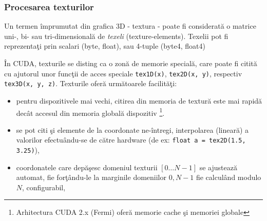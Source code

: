 \documentclass{article}
\begin{document}
\subsubsection{Procesarea texturilor}

\begin{minipage}{\textwidth}
Un termen împrumutat din grafica 3D - textura - poate fi considerată o matrice uni-, bi- sau tri-dimensională de \textit{texeli} (texture-elements). Texelii pot fi reprezentaţi prin scalari (byte, float), sau 4-tuple (byte4, float4)

În CUDA, texturile se disting ca o zonă de memorie specială, care poate fi citită cu ajutorul unor funcţii de acces speciale \texttt{tex1D(x)}, \texttt{tex2D(x, y)}, respectiv \texttt{tex3D(x, y, z)}. Texturile oferă următoarele facilităţi:

\begin{itemize}
	\item pentru dispozitivele mai vechi, citirea din memoria de textură este mai rapidă decât accesul din memoria globală dispozitiv \footnote{Arhitectura CUDA 2.x (Fermi) oferă memorie cache şi memoriei globale}.

	\item se pot citi şi elemente de la coordonate ne-întregi, interpolarea (lineară) a valorilor efectuându-se de către hardware (de ex: \texttt{float a = tex2D(1.5, 3.25)}),

	\item coordonatele care depăşesc domeniul texturii $[0 \dots N-1]$ se ajustează automat, fie forţându-le la marginile domeniilor $0, N-1$ fie calculând modulo $N$, configurabil,
\end{itemize}

\end{minipage}
\end{document}

